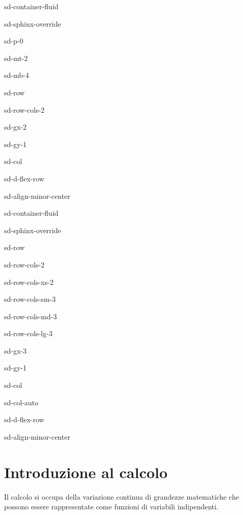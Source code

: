 \documentclass[letterpaper,10pt,italian]{jupyterBook}
\begin{document}
\begin{sphinxuseclass}{sd-container-fluid}
\begin{sphinxuseclass}{sd-sphinx-override}
\begin{sphinxuseclass}{sd-p-0}
\begin{sphinxuseclass}{sd-mt-2}
\begin{sphinxuseclass}{sd-mb-4}
\begin{sphinxuseclass}{sd-row}
\begin{sphinxuseclass}{sd-row-cols-2}
\begin{sphinxuseclass}{sd-gx-2}
\begin{sphinxuseclass}{sd-gy-1}
\begin{sphinxuseclass}{sd-col}
\begin{sphinxuseclass}{sd-d-flex-row}
\begin{sphinxuseclass}{sd-align-minor-center}
\begin{sphinxuseclass}{sd-container-fluid}
\begin{sphinxuseclass}{sd-sphinx-override}
\begin{sphinxuseclass}{sd-row}
\begin{sphinxuseclass}{sd-row-cols-2}
\begin{sphinxuseclass}{sd-row-cols-xs-2}
\begin{sphinxuseclass}{sd-row-cols-sm-3}
\begin{sphinxuseclass}{sd-row-cols-md-3}
\begin{sphinxuseclass}{sd-row-cols-lg-3}
\begin{sphinxuseclass}{sd-gx-3}
\begin{sphinxuseclass}{sd-gy-1}
\begin{sphinxuseclass}{sd-col}
\begin{sphinxuseclass}{sd-col-auto}
\begin{sphinxuseclass}{sd-d-flex-row}
\begin{sphinxuseclass}{sd-align-minor-center}
\end{sphinxuseclass}
\end{sphinxuseclass}
\end{sphinxuseclass}
\end{sphinxuseclass}
\end{sphinxuseclass}
\end{sphinxuseclass}
\end{sphinxuseclass}
\end{sphinxuseclass}
\end{sphinxuseclass}
\end{sphinxuseclass}
\end{sphinxuseclass}
\end{sphinxuseclass}
\end{sphinxuseclass}
\end{sphinxuseclass}
\end{sphinxuseclass}
\end{sphinxuseclass}
\end{sphinxuseclass}
\end{sphinxuseclass}
\end{sphinxuseclass}
\end{sphinxuseclass}
\end{sphinxuseclass}
\end{sphinxuseclass}
\end{sphinxuseclass}
\end{sphinxuseclass}
\end{sphinxuseclass}
\end{sphinxuseclass}

\chapter{Introduzione al calcolo}
\label{\detokenize{ch/calculus:introduzione-al-calcolo}}\label{\detokenize{ch/calculus:math-hs-calculus}}\label{\detokenize{ch/calculus::doc}}
\sphinxAtStartPar
Il calcolo si occupa della variazione continua di grandezze matematiche che possono essere rappresentate come funzioni di variabili indipendenti.
\end{document}
